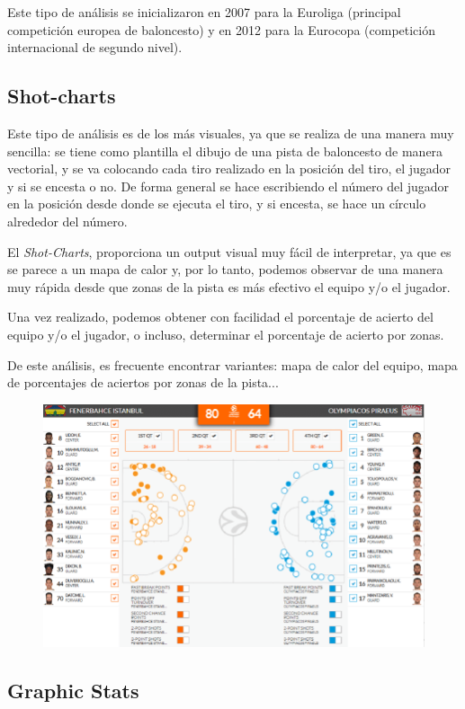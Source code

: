 \documentclass[paper=a4, fontsize=9pt]{article}
\begin{document}
Este tipo de análisis se inicializaron en 2007 para la Euroliga (principal competición europea de baloncesto) y en 2012 para la Eurocopa (competición internacional de segundo nivel).

\clearpage

\subsection{Shot-charts}

Este tipo de análisis es de los más visuales, ya que se realiza de una manera muy sencilla: se tiene como plantilla el dibujo de una pista de baloncesto de manera vectorial, y se va colocando cada tiro realizado en la posición del tiro, el jugador y si se encesta o no. De forma general se hace escribiendo el número del jugador en la posición desde donde se ejecuta el tiro, y si encesta, se hace un círculo alrededor del número.

El \emph{Shot-Charts}, proporciona un output visual muy fácil de interpretar, ya que es se parece a un mapa de calor y, por lo tanto, podemos observar de una manera muy rápida desde que zonas de la pista es más efectivo el equipo y/o el jugador.

Una vez realizado, podemos obtener con facilidad el porcentaje de acierto del equipo y/o el jugador, o incluso, determinar el porcentaje de acierto por zonas.

De este análisis, es frecuente encontrar variantes: mapa de calor del equipo, mapa de porcentajes de aciertos por zonas de la pista...

\begin{figure}[H]
\centering
\includegraphics[width=.5\linewidth]{imagenes/shot_chart_1.png}
\label{fig:SC_FO}
\end{figure}


\subsection{Graphic Stats}
\end{document}
